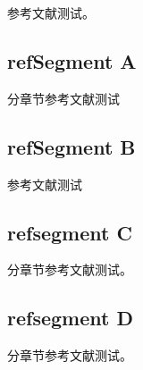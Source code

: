 \documentclass{article}
\begin{document}
\small 	参考文献测试\cite{Gradshteyn2000--}。

	\begin{refsegment}
		\section{refSegment A}
		分章节参考文献测试\cite{Chiani2003-840-845}
		\printbibliography[segment=1,heading=subbibliography,title=文献A]
	\end{refsegment}
	
	\begin{refsegment}
		\section{refSegment B}
		参考文献测试\cite{张敏莉2007-500-503}
	\end{refsegment}
	\printbibliography[segment=2,heading=subbibliography,title=文献B]
	
	\begin{refsegment}
		\section{refsegment C}
		分章节参考文献测试\cite{Simon2004--}。
	\end{refsegment}

	\begin{refsegment}
		\section{refsegment D}
		分章节参考文献测试\cite{Lin2004--}。
	\end{refsegment}

    


    \begin{refcontext}[sorting=none]
    \printbibliography[heading=bibliography,title=文献全局,resetnumbers=1]
    \end{refcontext}
\end{document}
